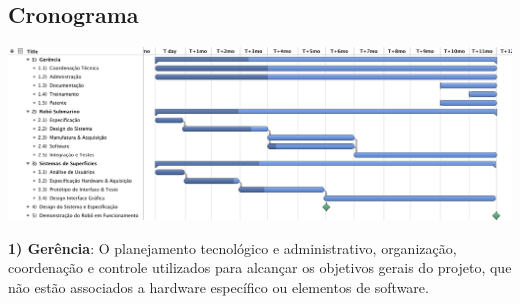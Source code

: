 
\begin{landscape}
\thispagestyle{empty} %

\vspace*{2cm}
\section{Cronograma}
\label{cronograma}

\vfill

\begin{center}
    \includegraphics[width=1\columnwidth]{figs/gantt/Gantt.pdf}
\end{center}

\vfill
\vspace*{2cm}
\end{landscape}
\restoregeometry


{\bf  1) Gerência}: O planejamento tecnológico e administrativo, organização, coordenação e controle utilizados para alcançar os objetivos gerais do projeto, que não estão associados a hardware específico ou elementos de software. 

